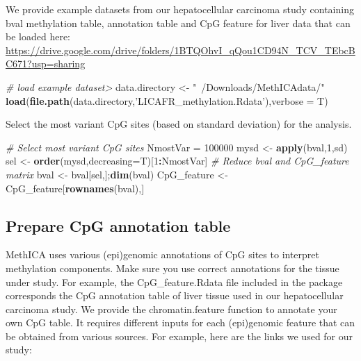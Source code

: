 \documentclass[]{article}
\newenvironment{Shaded}{\begin{snugshade}}{\end{snugshade}}
\newcommand{\KeywordTok}[1]{\textcolor[rgb]{0.13,0.29,0.53}{\textbf{#1}}}
\newcommand{\DataTypeTok}[1]{\textcolor[rgb]{0.13,0.29,0.53}{#1}}
\newcommand{\DecValTok}[1]{\textcolor[rgb]{0.00,0.00,0.81}{#1}}
\newcommand{\StringTok}[1]{\textcolor[rgb]{0.31,0.60,0.02}{#1}}
\newcommand{\CommentTok}[1]{\textcolor[rgb]{0.56,0.35,0.01}{\textit{#1}}}
\newcommand{\OperatorTok}[1]{\textcolor[rgb]{0.81,0.36,0.00}{\textbf{#1}}}
\newcommand{\NormalTok}[1]{#1}
\begin{document}
We provide example datasets from our hepatocellular carcinoma study
containing bval methylation table, annotation table and CpG feature for
liver data that can be loaded here:
\url{https://drive.google.com/drive/folders/1BTQOhvI_qQou1CD94N_TCV_TEbcBC671?usp=sharing}

\begin{Shaded}
\begin{Highlighting}[]
\CommentTok{# load example dataset> }
\NormalTok{data.directory <-}\StringTok{ "~/Downloads/MethICAdata/"}
\KeywordTok{load}\NormalTok{(}\KeywordTok{file.path}\NormalTok{(data.directory,}\StringTok{'LICAFR_methylation.Rdata'}\NormalTok{),}\DataTypeTok{verbose =}\NormalTok{ T)}
\end{Highlighting}
\end{Shaded}

Select the most variant CpG sites (based on standard deviation) for the
analysis.

\begin{Shaded}
\begin{Highlighting}[]
\CommentTok{# Select most variant CpG sites }
\NormalTok{NmostVar =}\StringTok{ }\DecValTok{100000}
\NormalTok{mysd <-}\StringTok{ }\KeywordTok{apply}\NormalTok{(bval,}\DecValTok{1}\NormalTok{,sd)}
\NormalTok{sel <-}\StringTok{ }\KeywordTok{order}\NormalTok{(mysd,}\DataTypeTok{decreasing=}\NormalTok{T)[}\DecValTok{1}\OperatorTok{:}\NormalTok{NmostVar]}
\CommentTok{# Reduce bval and CpG_feature matrix}
\NormalTok{bval <-}\StringTok{ }\NormalTok{bval[sel,];}\KeywordTok{dim}\NormalTok{(bval)}
\NormalTok{CpG_feature <-}\StringTok{ }\NormalTok{CpG_feature[}\KeywordTok{rownames}\NormalTok{(bval),]}
\end{Highlighting}
\end{Shaded}

\subsection{Prepare CpG annotation
table}\label{prepare-cpg-annotation-table}

MethICA uses various (epi)genomic annotations of CpG sites to interpret
methylation components. Make sure you use correct annotations for the
tissue under study. For example, the CpG\_feature.Rdata file included in
the package corresponds the CpG annotation table of liver tissue used in
our hepatocellular carcinoma study. We provide the chromatin.feature
function to annotate your own CpG table. It requires different inputs
for each (epi)genomic feature that can be obtained from various sources.
For example, here are the links we used for our study:
\end{document}
